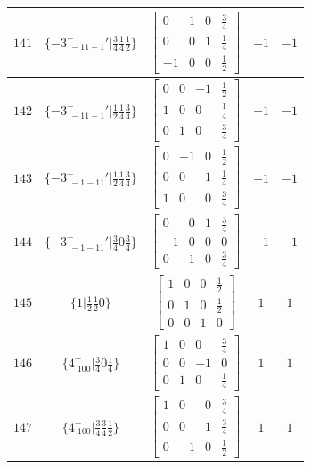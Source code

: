 \documentclass[fleqn,8pt]{jsarticle}
\begin{document}
\begin{longtable}{ccccc}
$ 141 $ & $ \{-3^{-}_{\,\,-11-1}{}'|\frac{3}{4} \frac{1}{4} \frac{1}{2}\} $ & $ \begin{bmatrix} 0 & 1 & 0 & \frac{3}{4} \\ 0 & 0 & 1 & \frac{1}{4} \\ -1 & 0 & 0 & \frac{1}{2} \end{bmatrix} $ & $ -1 $ & $ -1 $ \\ \hline
$ 142 $ & $ \{-3^{+}_{\,\,-11-1}{}'|\frac{1}{2} \frac{1}{4} \frac{3}{4}\} $ & $ \begin{bmatrix} 0 & 0 & -1 & \frac{1}{2} \\ 1 & 0 & 0 & \frac{1}{4} \\ 0 & 1 & 0 & \frac{3}{4} \end{bmatrix} $ & $ -1 $ & $ -1 $ \\ \hline
$ 143 $ & $ \{-3^{-}_{\,\,-1-11}{}'|\frac{1}{2} \frac{1}{4} \frac{3}{4}\} $ & $ \begin{bmatrix} 0 & -1 & 0 & \frac{1}{2} \\ 0 & 0 & 1 & \frac{1}{4} \\ 1 & 0 & 0 & \frac{3}{4} \end{bmatrix} $ & $ -1 $ & $ -1 $ \\ \hline
$ 144 $ & $ \{-3^{+}_{\,\,-1-11}{}'|\frac{3}{4} 0 \frac{3}{4}\} $ & $ \begin{bmatrix} 0 & 0 & 1 & \frac{3}{4} \\ -1 & 0 & 0 & 0 \\ 0 & 1 & 0 & \frac{3}{4} \end{bmatrix} $ & $ -1 $ & $ -1 $ \\ \hline
$ 145 $ & $ \{1|\frac{1}{2} \frac{1}{2} 0\} $ & $ \begin{bmatrix} 1 & 0 & 0 & \frac{1}{2} \\ 0 & 1 & 0 & \frac{1}{2} \\ 0 & 0 & 1 & 0 \end{bmatrix} $ & $ 1 $ & $ 1 $ \\ \hline
$ 146 $ & $ \{4^{+}_{\,\,100}|\frac{3}{4} 0 \frac{1}{4}\} $ & $ \begin{bmatrix} 1 & 0 & 0 & \frac{3}{4} \\ 0 & 0 & -1 & 0 \\ 0 & 1 & 0 & \frac{1}{4} \end{bmatrix} $ & $ 1 $ & $ 1 $ \\ \hline
$ 147 $ & $ \{4^{-}_{\,\,100}|\frac{3}{4} \frac{3}{4} \frac{1}{2}\} $ & $ \begin{bmatrix} 1 & 0 & 0 & \frac{3}{4} \\ 0 & 0 & 1 & \frac{3}{4} \\ 0 & -1 & 0 & \frac{1}{2} \end{bmatrix} $ & $ 1 $ & $ 1 $ \\ \hline

\end{longtable}
\end{document}
